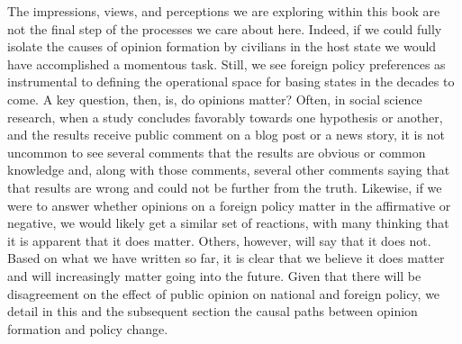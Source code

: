 {	The impressions, views, and perceptions we are exploring within this book are not the final step of the processes we care about here. Indeed, if we could fully isolate the causes of opinion formation by civilians in the host state we would have accomplished a momentous task. Still, we see foreign policy preferences as instrumental to defining the operational space for basing states in the decades to come. A key question, then, is, do opinions matter? Often, in social science research, when a study concludes favorably towards one hypothesis or another, and the results receive public comment on a blog post or a news story, it is not uncommon to see several comments that the results are obvious or common knowledge and, along with those comments, several other comments saying that that results are wrong and could not be further from the truth. Likewise, if we were to answer whether opinions on a foreign policy matter in the affirmative or negative, we would likely get a similar set of reactions, with many thinking that it is apparent that it does matter. Others, however, will say that it does not. Based on what we have written so far, it is clear that we believe it does matter and will increasingly matter going into the future. Given that there will be disagreement on the effect of public opinion on national and foreign policy, we detail in this and the subsequent section the causal paths between opinion formation and policy change.
	
}

